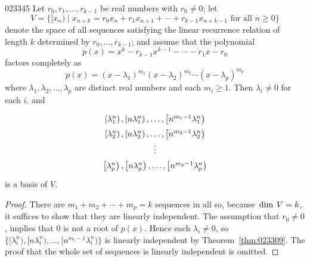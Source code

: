 \begin{theorem}{}{023345}
Let $r_{0}, r_{1}, \dots, r_{k-1}$ be real numbers with $r_{0} \neq 0$; let
\begin{equation*}
V = \{[x_n) \mid x_{n+k} = r_{0}x_n + r_{1}x_{n+1} + \cdots + r_{k-1}x_{n+k-1} \mbox{ for all } n \geq 0 \}
\end{equation*}
denote the space of all sequences satisfying the linear recurrence relation of length $k$ determined by $r_{0}, \dots, r_{k-1}$; and assume that the polynomial
\begin{equation*}
p(x) = x^k - r_{k-1}x^{k-1} - \cdots - r_{1}x - r_{0}
\end{equation*}
factors completely as
\begin{equation*}
p(x) = (x - \lambda_1)^{m_1}(x-\lambda_2)^{m_2} \cdots (x - \lambda_p)^{m_p}
\end{equation*}
where $\lambda_{1}, \lambda_{2}, \dots, \lambda_{p}$ are distinct real numbers and each $m_{i} \geq 1$. Then $\lambda_{i} \neq 0$ for each $i$, and
\begin{equation*}
\def\arraystretch{1.5}
\begin{array}{c}
\left[\lambda_{1}^{n}\right), \left[n\lambda_{1}^{n}\right), \dots, \left[n^{m_{1}-1}\lambda_{1}^{n}\right) \\
\left[\lambda_{2}^{n}\right), \left[n\lambda_{2}^{n}\right), \dots, \left[n^{m_{2}-1}\lambda_{2}^{n}\right) \\
\vdots \\
\left[\lambda_{p}^{n}\right), \left[n\lambda_{p}^{n}\right), \dots, \left[n^{m_{p}-1}\lambda_{p}^{n}\right)
\end{array}
\end{equation*}
is a basis of $V$.
\end{theorem}

\begin{proof}
There are $m_{1} + m_{2} + \cdots + m_{p} = k$ sequences in all so, because $\thinspace\operatorname{dim \medspace}V = k$, it suffices to show that they are linearly independent. The assumption that $r_{0} \neq 0$, implies that $0$ is not a root of $p(x)$. Hence each $\lambda_{i} \neq 0$, so $\{[\lambda_i^n), [n\lambda_i^n), \dots, [n^{m_i-1}\lambda_i^n)\}$ is linearly independent by Theorem~\ref{thm:023309}. The proof that the whole set of sequences is linearly independent is omitted.
\end{proof}

